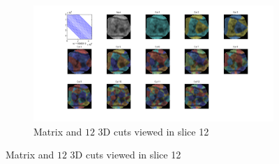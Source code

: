 \documentclass{article}
\begin{document}
      \begin{figure}[h]
        \centering
              \begin{subfigure}[t]{\linewidth}
                \centering
                \includegraphics[width=\linewidth,trim={5cm 2cm 5cm 0cm},clip]{imgs/seg12}
                \caption{Matrix and $12$ 3D cuts viewed in slice 12 }
              \end{subfigure}
              

\end{figure}
\end{document}
